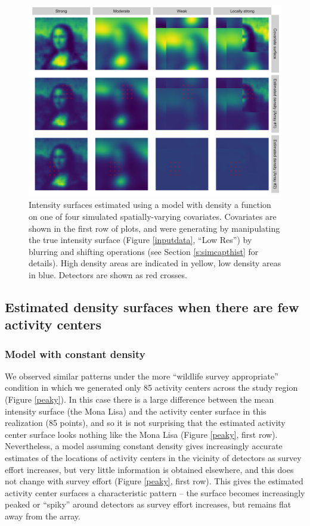 \documentclass[a4paper,12pt]{article}
\begin{document}
\begin{figure}[htbp]
\centering
\includegraphics[width=1\textwidth]{mona_covariates}
\caption{Intensity surfaces estimated using a model with density a function on one of four simulated spatially-varying covariates. Covariates are shown in the first row of plots, and were generating by manipulating the true intensity surface (Figure \ref{inputdata}, ``Low Res'') by blurring and shifting operations (see Section \ref{s:simcapthist} for details). High density areas are indicated in yellow, low density areas in blue. Detectors are shown as red crosses.} 
\label{covariates}
\end{figure}

\subsection{Estimated density surfaces when there are few activity centers}

\subsubsection{Model with constant density}

We observed similar patterns under the more ``wildlife survey appropriate'' condition in which we generated only 85 activity centers across the study region (Figure \ref{peaky}). In this case there is a large difference between the mean intensity surface (the Mona Lisa) and the activity center surface in this realization (85 points), and so it is not surprising that the estimated activity center surface looks nothing like the Mona Lisa (Figure \ref{peaky}, first row). Nevertheless, a model assuming constant density gives increasingly accurate estimates of the locations of activity centers in the vicinity of detectors as survey effort increases, but very little information is obtained elsewhere, and this does not change with survey effort (Figure \ref{peaky}, first row). This gives the estimated activity center surfaces a characteristic pattern -- the surface becomes increasingly peaked or ``spiky'' around detectors as survey effort increases, but remains flat away from the array. 
\end{document}
